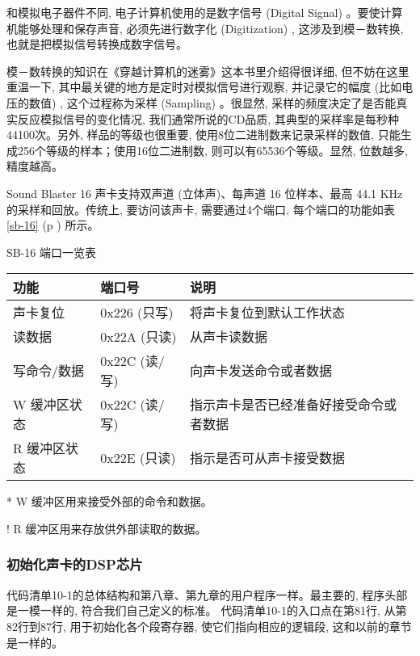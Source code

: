 \documentclass[12pt]{article}
\begin{document}
\begin{CJK}{UTF8}{gbsn}
和模拟电子器件不同, 电子计算机使用的是数字信号 (Digital Signal) 。要使计算机能够处理和保存声音, 必须先进行数字化 (Digitization) , 这涉及到模－数转换, 也就是把模拟信号转换成数字信号。

模－数转换的知识在《穿越计算机的迷雾》这本书里介绍得很详细, 但不妨在这里重温一下, 其中最关键的地方是定时对模拟信号进行观察, 并记录它的幅度 (比如电压的数值) , 这个过程称为采样 (Sampling) 。很显然, 采样的频度决定了是否能真实反应模拟信号的变化情况, 我们通常所说的CD品质, 其典型的采样率是每秒种44100次。另外, 样品的等级也很重要, 使用8位二进制数来记录采样的数值, 只能生成256个等级的样本；使用16位二进制数, 则可以有65536个等级。显然, 位数越多, 精度越高。

Sound Blaster 16 声卡支持双声道 (立体声)、每声道 16 位样本、最高 44.1
KHz的采样和回放。传统上, 要访问该声卡, 需要通过4个端口, 每个端口的功能如表 \ref{sb-16} (p \pageref{sb-16})
所示。

\begin{threeparttable}
\caption{SB-16 端口一览表}\label{sb-16}
\begin{tabular}{p{2.7cm}p{1.5cm}p{2.5cm}}
\hline
功能 & 端口号 & 说明 \\
\hline
声卡复位 &	0x226 (只写) & 	将声卡复位到默认工作状态 \\
\hline
读数据	& 0x22A (只读)& 	从声卡读数据 \\
\hline
写命令/数据	& 0x22C (读/写) &	向声卡发送命令或者数据 \\
\hline
W 缓冲区状态\tnote{*} & 0x22C (读/写) &	指示声卡是否已经准备好接受命令或者数据 \\
\hline
R 缓冲区状态\tnote{!}& 0x22E (只读) 	& 指示是否可从声卡接受数据 \\
\hline
\end{tabular}
\begin{tablenotes}\small
\item[*]W 缓冲区用来接受外部的命令和数据。
\item[!]R 缓冲区用来存放供外部读取的数据。
\end{tablenotes}
\end{threeparttable}

\subsubsection{初始化声卡的DSP芯片}
代码清单10-1的总体结构和第八章、第九章的用户程序一样。最主要的, 程序头部是一模一样的, 符合我们自己定义的标准。
代码清单10-1的入口点在第81行, 从第82行到87行, 用于初始化各个段寄存器, 使它们指向相应的逻辑段, 这和以前的章节是一样的。


\end{CJK}
\end{document}
